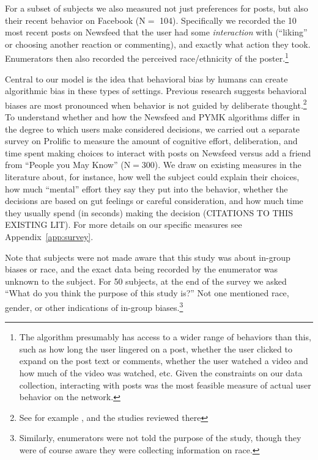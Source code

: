 \documentclass[12pt,letterpaper]{article}
\newcommand{\ProlificSampleSize}{300}
\newcommand{\RecentInteractionsSampleSize}{104}
\newcommand{\StudyAboutSampleSize}{50}
\begin{document}
For a subset of subjects we also measured not just preferences for posts, but also their recent behavior on Facebook (N$=$ \RecentInteractionsSampleSize). Specifically we recorded the 10 most recent posts on Newsfeed that the user had some \emph{interaction} with (``liking'' or choosing another reaction or commenting), and exactly what action they took. Enumerators then also recorded the perceived race/ethnicity of the poster.\footnote{The algorithm presumably has access to a wider range of behaviors than this, such as how long the user lingered on a post, whether the user clicked to expand on the post text or comments, whether the user watched a video and how much of the video was watched, etc. Given the constraints on our data collection, interacting with posts was the most feasible measure of actual user behavior on the network.} 

Central to our model is the idea that behavioral bias by humans can create algorithmic bias in these types of settings. Previous research suggests behavioral biases are most pronounced when behavior is not guided by deliberate thought.\footnote{See for example \citet{payne2002best}, \citet{lueke2015mindfulness} and the studies reviewed there} To understand whether and how the Newsfeed and PYMK algorithms differ in the degree to which users make considered decisions, we carried out a separate survey on Prolific to measure the amount of cognitive effort, deliberation, and time spent making choices to interact with posts on Newsfeed versus add a friend from ``People you May Know'' (N$=$\ProlificSampleSize). We draw on existing measures in the literature about, for instance, how well the subject could explain their choices, how much ``mental'' effort they say they put into the behavior, whether the decisions are based on gut feelings or careful consideration, and how much time they usually spend (in seconds) making the decision (CITATIONS TO THIS EXISTING LIT). For more details on our specific measures see Appendix~\ref{app:survey}.

Note that subjects were not made aware that this study was about in-group biases or race, and the exact data being recorded by the enumerator was unknown to the subject. For \StudyAboutSampleSize{} subjects, at the end of the survey we asked ``What do you think the purpose of this study is?'' Not one mentioned race, gender, or other indications of in-group biases.\footnote{Similarly, enumerators were not told the purpose of the study, though they were of course aware they were collecting information on race.}
\end{document}
